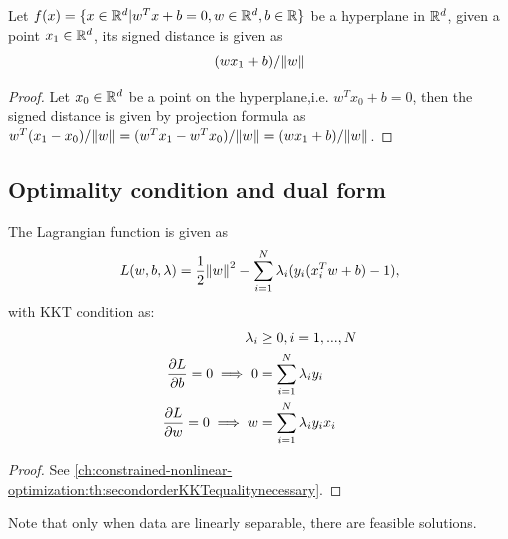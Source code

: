 \begin{refsection}
\begin{lemma}
	Let $f(x) =\{x\in\mathbb{R}^d | w^Tx + b = 0,w\in \mathbb{R}^d,b\in \mathbb{R}\}$ be a hyperplane in $\mathbb{R}^d$, given a point $x_1 \in \mathbb{R}^d$, its signed distance is given as $$(wx_1 + b)/\norm{w}$$
\end{lemma}
\begin{proof}
	Let $x_0 \in \mathbb{R}^d$ be a point on the hyperplane,i.e. $w^Tx_0 + b =0$, then the signed distance is given by projection formula as $w^T(x_1-x_0)/\norm{w} = (w^Tx_1 - w^Tx_0)/\norm{w} = (wx_1 + b)/\norm{w}$.	
\end{proof}

\subsection{Optimality condition and dual form}

\begin{lemma}\cite[328]{bishop2006pattern}
	The Lagrangian function is given as
	$$L(w,b,\lambda) = \frac{1}{2}\norm{w}^2 - \sum_{i=1}^N \lambda_i(y_i(x_i^Tw + b) - 1),$$
	with KKT condition as:
	\begin{align*}
	\lambda_i &\geq 0,i=1,...,N \\
	\frac{\partial L}{\partial b} = 0 \implies 0 &= \sum_{i=1}^N \lambda_iy_i\\
	\frac{\partial L}{\partial w} = 0 \implies w &= \sum_{i=1}^N \lambda_iy_ix_i\\
	\end{align*}
\end{lemma}
\begin{proof}
	See \autoref{ch:constrained-nonlinear-optimization:th:secondorderKKTequalitynecessary}.
\end{proof}


\begin{remark}
	Note that only when data are linearly separable, there are feasible solutions. 	
\end{remark}



\end{refsection}
